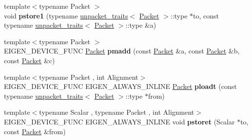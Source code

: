 \begin{DoxyCompactItemize}
\item 
\mbox{\label{namespace_eigen_1_1internal_ade298df1727ec6a1b4dd7a9d2ce436d6}} 
{\footnotesize template$<$typename Packet $>$ }\\void {\bfseries pstore1} (typename \hyperlink{struct_eigen_1_1internal_1_1unpacket__traits}{unpacket\+\_\+traits}$<$ \hyperlink{union_eigen_1_1internal_1_1_packet}{Packet} $>$\+::type $\ast$to, const typename \hyperlink{struct_eigen_1_1internal_1_1unpacket__traits}{unpacket\+\_\+traits}$<$ \hyperlink{union_eigen_1_1internal_1_1_packet}{Packet} $>$\+::type \&a)
\item 
\mbox{\label{namespace_eigen_1_1internal_ab13a05c13dc507207bbbb7a5f082085a}} 
{\footnotesize template$<$typename Packet $>$ }\\E\+I\+G\+E\+N\+\_\+\+D\+E\+V\+I\+C\+E\+\_\+\+F\+U\+NC \hyperlink{union_eigen_1_1internal_1_1_packet}{Packet} {\bfseries pmadd} (const \hyperlink{union_eigen_1_1internal_1_1_packet}{Packet} \&a, const \hyperlink{union_eigen_1_1internal_1_1_packet}{Packet} \&b, const \hyperlink{union_eigen_1_1internal_1_1_packet}{Packet} \&c)
\item 
\mbox{\label{namespace_eigen_1_1internal_ac12becb16e24b41520ac853b2b5bf2cb}} 
{\footnotesize template$<$typename Packet , int Alignment$>$ }\\E\+I\+G\+E\+N\+\_\+\+D\+E\+V\+I\+C\+E\+\_\+\+F\+U\+NC E\+I\+G\+E\+N\+\_\+\+A\+L\+W\+A\+Y\+S\+\_\+\+I\+N\+L\+I\+NE \hyperlink{union_eigen_1_1internal_1_1_packet}{Packet} {\bfseries ploadt} (const typename \hyperlink{struct_eigen_1_1internal_1_1unpacket__traits}{unpacket\+\_\+traits}$<$ \hyperlink{union_eigen_1_1internal_1_1_packet}{Packet} $>$\+::type $\ast$from)
\item 
\mbox{\label{namespace_eigen_1_1internal_a8de0ba2d55374f1277e7266e1788b3db}} 
{\footnotesize template$<$typename Scalar , typename Packet , int Alignment$>$ }\\E\+I\+G\+E\+N\+\_\+\+D\+E\+V\+I\+C\+E\+\_\+\+F\+U\+NC E\+I\+G\+E\+N\+\_\+\+A\+L\+W\+A\+Y\+S\+\_\+\+I\+N\+L\+I\+NE void {\bfseries pstoret} (Scalar $\ast$to, const \hyperlink{union_eigen_1_1internal_1_1_packet}{Packet} \&from)
\item 
\mbox{\label{namespace_eigen_1_1internal_ae1ef49e5702b14b22da9418b2831ce88}} 

\end{DoxyCompactItemize}
